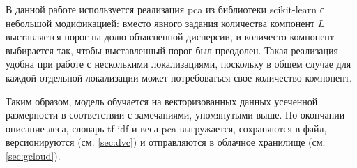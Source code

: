 В данной работе используется реализация \gls{pca} из библиотеки \gls{scikit-learn} с небольшой модификацией: вместо явного задания количества компонент $L$ выставляется порог на долю объясненной дисперсии, и количесто компонент выбирается так, чтобы выставленный порог был преодолен.
Такая реализация удобна при работе с несколькими локализациями, поскольку в общем случае для каждой отдельной локализации может потребоваться свое количество компонент.

Таким образом, модель обучается на векторизованных данных усеченной размерности в соответствии с замечаниями, упомянутыми выше.
По окончании описание леса, словарь \acrshort{tf-idf} и веса \gls{pca} выгружается, сохраняются в файл, версионируются (см. \ref{sec:dvc}) и отправляются в облачное хранилище (см. \ref{sec:gcloud}).
